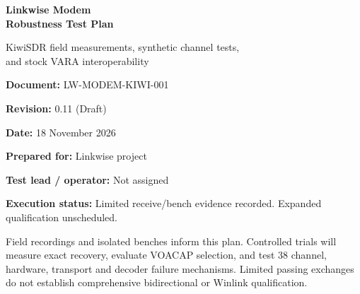 \documentclass[11pt,a4paper]{article}
\begin{document}
\hypersetup{pageanchor=false}
\begin{titlepage}
\centering
\vspace*{1in}
{\Huge\bfseries Linkwise Modem\\Robustness Test Plan\par}
\vspace{0.2in}
{\large KiwiSDR field measurements, synthetic channel tests,\\and stock VARA interoperability\par}
\vfill
\begin{minipage}{0.7\textwidth}
\textbf{Document:} LW-MODEM-KIWI-001\par
\textbf{Revision:} 0.11 (Draft)\par
\textbf{Date:} 18 November 2026\par
\textbf{Prepared for:} Linkwise project\par
\textbf{Test lead / operator:} Not assigned\par
\textbf{Execution status:} Limited receive/bench evidence recorded. Expanded qualification unscheduled.
\end{minipage}\par
\vspace{0.3in}
\begin{minipage}{0.88\textwidth}
Field recordings and isolated benches inform this plan. Controlled trials
will measure exact recovery, evaluate VOACAP selection, and test 38 channel,
hardware, transport and decoder failure mechanisms. Limited passing exchanges
do not establish comprehensive bidirectional or Winlink qualification.
\end{minipage}
\vspace{0.5in}
\end{titlepage}
\hypersetup{pageanchor=true}
\end{document}

